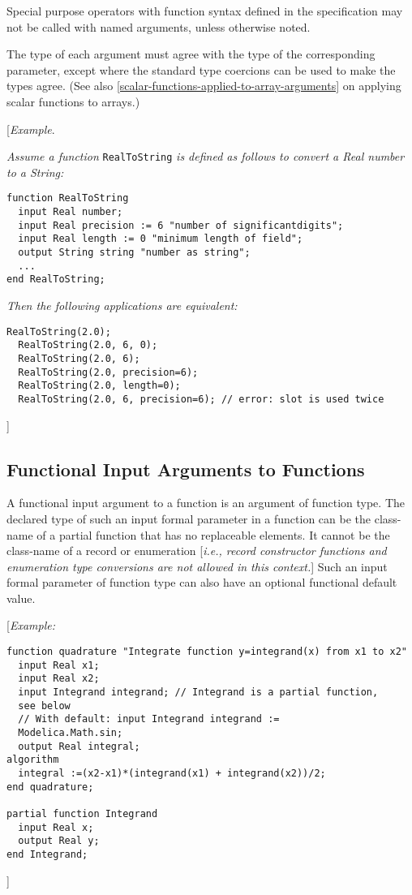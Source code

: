 Special purpose operators with function syntax defined in the
specification may not be called with named arguments, unless otherwise
noted.

The type of each argument must agree with the type of the corresponding
parameter, except where the standard type coercions can be used to make
the types agree. (See also \autoref{scalar-functions-applied-to-array-arguments} on applying scalar functions
to arrays.)

{[}\emph{Example}.

\emph{Assume a function} \lstinline!RealToString! \emph{is defined as follows to
convert a Real number to a String:}

\begin{lstlisting}[language=modelica]
function RealToString
  input Real number;
  input Real precision := 6 "number of significantdigits";
  input Real length := 0 "minimum length of field";
  output String string "number as string";
  ...
end RealToString;
\end{lstlisting}
\emph{Then the following applications are equivalent:}

\begin{lstlisting}[language=modelica]
  RealToString(2.0);
  RealToString(2.0, 6, 0);
  RealToString(2.0, 6);
  RealToString(2.0, precision=6);
  RealToString(2.0, length=0);
  RealToString(2.0, 6, precision=6); // error: slot is used twice
\end{lstlisting}
{]}

\subsection{Functional Input Arguments to Functions}

A functional input argument to a function is an argument of function
type. The declared type of such an input formal parameter in a function
can be the class-name of a partial function that has no replaceable
elements. It cannot be the class-name of a record or enumeration
{[}\emph{i.e., record constructor functions and enumeration type
conversions are not allowed in this context.}{]} Such an input formal
parameter of function type can also have an optional functional default
value.

{[}\emph{Example:}

\begin{lstlisting}[language=modelica]
  function quadrature "Integrate function y=integrand(x) from x1 to x2"
  input Real x1;
  input Real x2;
  input Integrand integrand; // Integrand is a partial function,
  see below
  // With default: input Integrand integrand :=
  Modelica.Math.sin;
  output Real integral;
algorithm
  integral :=(x2-x1)*(integrand(x1) + integrand(x2))/2;
end quadrature;

partial function Integrand
  input Real x;
  output Real y;
end Integrand;
\end{lstlisting}
{]}

